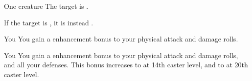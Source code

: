 \begin{spellheader}
    \spellrng{\rngclose}
    \spelldur{\durshort}
\end{spellheader}
\begin{spelleffects}
    \begin{spelltarget}{One creature}
        \spelleffect The target is \bewildered.

        If the target is \bloodied, it is instead \stunned.
    \end{spelltarget}
\end{spelleffects}
\begin{spellfooter}
    
\end{spellfooter}

\begin{spellheader}
    \spelldur{\durshort \dismissable}
\end{spellheader}
\begin{spelleffects}
    \begin{spelltarget}{You}
        \spelleffect You gain a  enhancement bonus to your physical attack and damage rolls. \spellbonusscalingdescription
    \end{spelltarget}
\end{spelleffects}
\begin{spellfooter}
    
\end{spellfooter}

\begin{spellheader}
    \spelldur{\durshort \dismissable}
\end{spellheader}
\begin{spelleffects}
    \begin{spelltarget}{You}
        \spelleffect You gain a  enhancement bonus to your physical attack and damage rolls, and all your defenses. This bonus increases to  at 14th caster level, and to  at 20th caster level.
    \end{spelltarget}
\end{spelleffects}
\begin{spellfooter}
    
\end{spellfooter}

